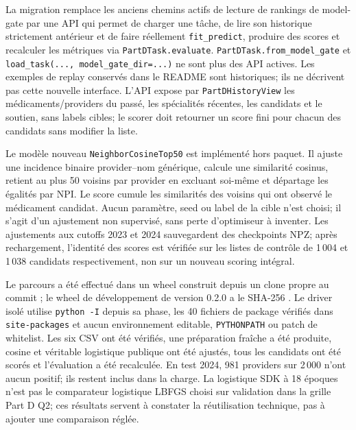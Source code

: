 La migration remplace les anciens chemins actifs de lecture de rankings de model-gate par une API qui permet de charger une tâche, de lire son historique strictement antérieur et de faire réellement \texttt{fit\_predict}, produire des scores et recalculer les métriques via \texttt{PartDTask.evaluate}. \texttt{PartDTask.from\_model\_gate} et \texttt{load\_task(..., model\_gate\_dir=...)} ne sont plus des API actives. Les exemples de replay conservés dans le README sont historiques; ils ne décrivent pas cette nouvelle interface. L'API expose par \texttt{PartDHistoryView} les médicaments/providers du passé, les spécialités récentes, les candidats et le soutien, sans labels cibles; le scorer doit retourner un score fini pour chacun des candidats sans modifier la liste\cite{hgbq2methods}.

Le modèle nouveau \texttt{NeighborCosineTop50} est implémenté hors paquet. Il ajuste une incidence binaire provider--nom générique, calcule une similarité cosinus, retient au plus 50 voisins par provider en excluant soi-même et départage les égalités par NPI. Le score cumule les similarités des voisins qui ont observé le médicament candidat. Aucun paramètre, seed ou label de la cible n'est choisi; il s'agit d'un ajustement non supervisé, sans perte d'optimiseur à inventer. Les ajustements aux cutoffs 2023 et 2024 sauvegardent des checkpoints NPZ; après rechargement, l'identité des scores est vérifiée sur les listes de contrôle de 1\,004 et 1\,038 candidats respectivement, non sur un nouveau scoring intégral.

\begin{table}[!htbp]\centering\small
\caption{Témoignage de réutilisation raw--ajustement--scores--évaluation : le modèle cosine externe n'est pas réglé; la logistique SDK conserve l'algorithme historique à 18 époques et ne correspond pas au gagnant LBFGS de la grille Q2.}
\label{tab:q2-reuse}

\end{table}

Le parcours a été effectué dans un wheel construit depuis un clone propre au commit ; le wheel de développement de version 0.2.0 a le SHA-256 . Le driver isolé utilise \texttt{python -I} depuis sa phase, les 40 fichiers de package vérifiés dans \texttt{site-packages} et aucun environnement editable, \texttt{PYTHONPATH} ou patch de whitelist. Les six CSV ont été vérifiés, une préparation fraîche a été produite, cosine et véritable logistique publique ont été ajustés, tous les candidats ont été scorés et l'évaluation a été recalculée. En test 2024, 981 providers sur 2\,000 n'ont aucun positif; ils restent inclus dans la charge. La logistique SDK à 18 époques n'est pas le comparateur logistique LBFGS choisi sur validation dans la grille Part D Q2; ces résultats servent à constater la réutilisation technique, pas à ajouter une comparaison réglée.

